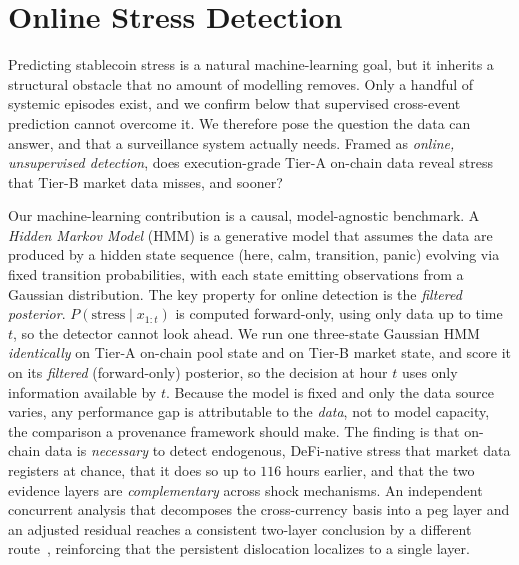 \documentclass[sigconf,anonymous]{acmart}
\begin{document}
\FloatBarrier  %

\section{Online Stress Detection}
\label{sec:prediction}

Predicting stablecoin stress is a natural machine-learning goal, but it inherits
a structural obstacle that no amount of modelling removes. Only a handful of
systemic episodes exist, and we confirm below that supervised cross-event
prediction cannot overcome it.  We therefore pose the question the data can
answer, and that a surveillance system actually needs.  Framed as \emph{online,
unsupervised detection}, does execution-grade Tier-A on-chain data reveal stress
that Tier-B market data misses, and sooner?

Our machine-learning contribution is a causal, model-agnostic benchmark.  A
\emph{Hidden Markov Model} (HMM) is a generative model that assumes the data are
produced by a hidden state sequence (here, calm, transition, panic) evolving via
fixed transition probabilities, with each state emitting observations from a
Gaussian distribution.  The key property for online detection is the \emph{filtered
posterior}. $P(\text{stress}\mid x_{1:t})$ is computed forward-only, using only data
up to time $t$, so the detector cannot look ahead.  We run one three-state Gaussian
HMM \emph{identically} on Tier-A on-chain pool state and on Tier-B market state, and
score it on its \emph{filtered} (forward-only) posterior, so the decision at hour
$t$ uses only information available by $t$.  Because the model is fixed and only
the data source varies, any performance gap is attributable to the \emph{data},
not to model capacity, the comparison a provenance framework should make.  The
finding is that on-chain data is \emph{necessary} to detect endogenous,
DeFi-native stress that market data registers at chance, that it does so up to
$116$ hours earlier, and that the two evidence layers are \emph{complementary}
across shock mechanisms. An independent concurrent analysis that decomposes the
cross-currency basis into a peg layer and an adjusted residual reaches a consistent
two-layer conclusion by a different route~\cite{iaqf_uchicago_crosscurrency_2026},
reinforcing that the persistent dislocation localizes to a single layer.
\end{document}
